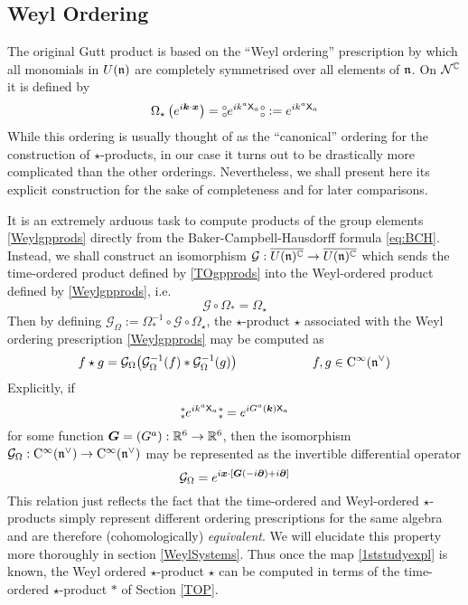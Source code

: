 \subsection{Weyl Ordering}
\label{WOP}
The original Gutt product \cite{Gutt1} is based on the ``Weyl ordering''
prescription by which all monomials in $U({\mathfrak n})$ are completely symmetrised over
all elements of ${\mathfrak n}$. On $\mathcal{N}^{\mathbb C}$ it is defined by
\begin{equation}
  \label{Weylgpprods}
  \Omega_\star\left( e^{ i{{\boldsymbol {k} }}\cdot{{\boldsymbol {x} }}}\right)=
  \mbox{$\substack{\circ\\\circ}$}  e^{ i k^a {\sf X}_a} \mbox{$\substack{\circ\\\circ}$}:= e^{ i k^a {\sf X}_a}
\end{equation}
While this ordering is usually thought of as the ``canonical'' ordering for the
construction of $\star$-products, in our case it turns out to be drastically more
complicated than the other orderings. Nevertheless, we shall present here its
explicit construction for the sake of completeness and for later comparisons.

It is an extremely arduous task to compute products of the group elements
\eqref{Weylgpprods} directly from the Baker-Campbell-Hausdorff formula
\eqref{eq:BCH}. Instead, we shall construct an isomorphism
$\mathcal{G}:\overline{U({\mathfrak n})^{\mathbb C}}\to \overline{U({\mathfrak n})^{\mathbb C}}$ which
sends the time-ordered product defined by \eqref{TOgpprods} into the
Weyl-ordered product defined by \eqref{Weylgpprods}, i.e.
\begin{equation}
  \label{1ststudy}
  \mathcal{G}\circ\Omega_*=\Omega_\star
\end{equation}
Then by defining
$\mathcal{G}_\Omega:=\Omega_*^{-1}\circ\mathcal{G}\circ\Omega_\star$,
the $\star$-product $\star$ associated with the Weyl ordering
prescription \eqref{Weylgpprods} may be computed as
\begin{equation}
  \label{WeylTOrel}
  f\star g=\mathcal{G}_\Omega\bigl(\mathcal{G}_\Omega^{-1}(f)*
  \mathcal{G}_\Omega^{-1}(g)\bigr) \qquad\qquad\qquad f,g\in{\rm C}^\infty({\mathfrak n}^\vee)
\end{equation}
Explicitly, if
\begin{equation}
  \label{1ststudyexpl}
  \mbox{$\substack{\ast\\\ast}$}  e^{ i k^a {\sf X}_a} \mbox{$\substack{\ast\\\ast}$}= e^{ i G^a({{\boldsymbol {k} }}) {\sf X}_a}
\end{equation}
for some function ${{\boldsymbol {G} }}=(G^a):{\mathbb R}^6\to{\mathbb R}^6$, then the isomorphism
$\mathcal{G}_\Omega:{\rm C}^\infty({\mathfrak n}^\vee)\to{\rm C}^\infty({\mathfrak n}^\vee)$ may be represented
as the invertible differential operator
\begin{equation}
  \label{Gdiffop}
  \mathcal{G}_\Omega= e^{ i{{\boldsymbol {x} }}\cdot[{{\boldsymbol {G} }}(- i{\boldsymbol {\partial} })+ i{\boldsymbol {\partial} }]}
\end{equation}
This relation just reflects the fact that the time-ordered and Weyl-ordered
$\star$-products simply represent different ordering prescriptions for the same
algebra and are therefore (cohomologically) {\it equivalent}. We will elucidate
this property more thoroughly in section \ref{WeylSystems}. Thus once the map
\eqref{1ststudyexpl} is known, the Weyl ordered $\star$-product $\star$ can be
computed in terms of the time-ordered $\star$-product $*$ of Section \ref{TOP}.

